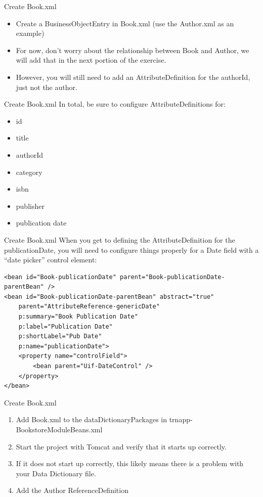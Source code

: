 \documentclass[xcolor=dvipsnames,14pt,professionalfonts]{beamer}
\begin{document}
\begin{frame}{Create Book.xml}
  \begin{itemize}
    \item Create a BusinessObjectEntry in Book.xml (use the Author.xml as an example)
    \item For now, don’t worry about the relationship between Book and Author, we will add that in the next portion of the exercise.
    \item However, you will still need to add an AttributeDefinition
      for the authorId, just not the author.
    \end{itemize}
  \end{frame}
  
\begin{frame}{Create Book.xml}
  In total, be sure to configure AttributeDefinitions for:
  \begin{itemize}
  \item id
  \item title
  \item authorId
  \item category
  \item isbn
  \item publisher
  \item publication date
\end{itemize}
\end{frame}

\begin{frame}[fragile]{Create Book.xml}
 When you get to defining the AttributeDefinition for the
 publicationDate, you will need to configure things properly for a
 Date field with a “date picker” control element:
 
 \begin{verbatim}
<bean id="Book-publicationDate" parent="Book-publicationDate-parentBean" />
<bean id="Book-publicationDate-parentBean" abstract="true" 
    parent="AttributeReference-genericDate"
    p:summary="Book Publication Date"
    p:label="Publication Date"
    p:shortLabel="Pub Date"
    p:name="publicationDate">
    <property name="controlField">
        <bean parent="Uif-DateControl" />
    </property>
</bean>
\end{verbatim}
\end{frame}

\begin{frame}{Create Book.xml}
  \begin{enumerate}
  \item Add Book.xml to the dataDictionaryPackages in trnapp-BookstoreModuleBeans.xml
  \item Start the project with Tomcat and verify that it starts up correctly.
  \item If it does not start up correctly, this likely means there is a problem with your Data Dictionary file.
  \item Add the Author ReferenceDefinition
    \end{enumerate}
  \end{frame}
\end{document}
